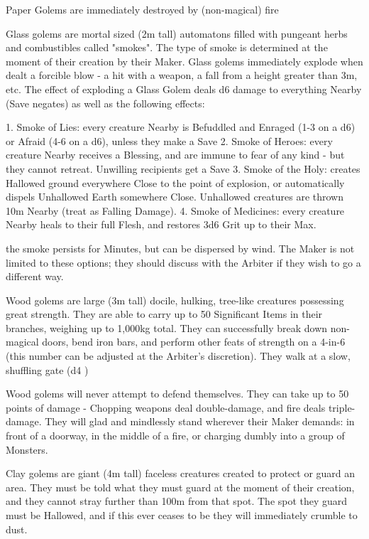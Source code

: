 {Paper Golems are immediately destroyed by (non-magical) fire


Glass golems are mortal sized (2m tall) automatons filled with pungeant herbs and combustibles called "smokes".  The type of smoke is determined at the moment of their creation by their Maker. Glass golems immediately explode when dealt a forcible blow - a hit with a weapon, a fall from a height greater than 3m, etc.  The effect of exploding a Glass Golem deals d6 damage to everything Nearby (Save negates) as well as the following effects:

1. Smoke of Lies:  every creature Nearby is Befuddled and Enraged (1-3 on a d6) or Afraid (4-6 on a d6), unless they make a Save
2. Smoke of Heroes:  every creature Nearby receives a Blessing, and are immune to fear of any kind - but they cannot retreat.  Unwilling recipients get a Save
3. Smoke of the Holy: creates Hallowed ground everywhere Close to the point of explosion, or automatically dispels Unhallowed Earth somewhere Close.  Unhallowed creatures are thrown 10m Nearby (treat as Falling Damage).
4. Smoke of Medicines: every creature Nearby heals to their full Flesh, and restores 3d6 Grit up to their Max.

the smoke persists for Minutes, but can be dispersed by wind.  The Maker is not limited to these options; they should discuss with the Arbiter if they wish to go a different way.




Wood golems are large (3m tall) docile, hulking, tree-like creatures possessing great strength. They are able to carry up to 50 Significant Items in their branches, weighing up to 1,000kg total.  They can successfully break down non-magical doors, bend iron bars, and perform other feats of strength on a 4-in-6 (this number can be adjusted at the Arbiter's discretion).  They walk at a slow, shuffling gate (d4 \MD)

Wood golems will never attempt to defend themselves.  They can take up to 50 points of damage - Chopping weapons deal double-damage, and fire deals triple-damage.  They will glad and mindlessly stand wherever their Maker demands: in front of a doorway, in the middle of a fire, or charging dumbly into a group of Monsters.

Clay golems are giant (4m tall) faceless creatures created to protect or guard an area.  They must be told what they must guard at the moment of their creation, and they cannot stray further than 100m from that spot.  The spot they guard must be Hallowed, and if this ever ceases to be they will immediately crumble to dust.

}
